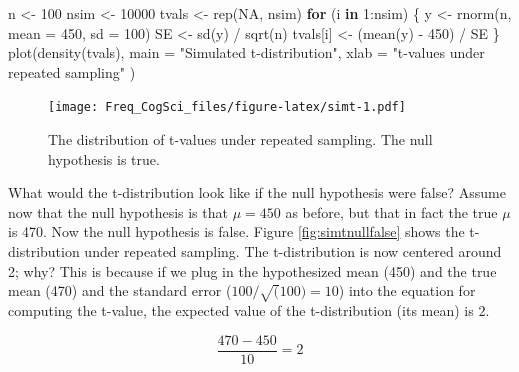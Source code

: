 \documentclass[
  12pt,
]{krantz}
\newenvironment{Shaded}{\begin{snugshade}}{\end{snugshade}}
\newcommand{\AttributeTok}[1]{\textcolor[rgb]{0.77,0.63,0.00}{#1}}
\newcommand{\ConstantTok}[1]{\textcolor[rgb]{0.00,0.00,0.00}{#1}}
\newcommand{\ControlFlowTok}[1]{\textcolor[rgb]{0.13,0.29,0.53}{\textbf{#1}}}
\newcommand{\DecValTok}[1]{\textcolor[rgb]{0.00,0.00,0.81}{#1}}
\newcommand{\FunctionTok}[1]{\textcolor[rgb]{0.00,0.00,0.00}{#1}}
\newcommand{\NormalTok}[1]{#1}
\newcommand{\OtherTok}[1]{\textcolor[rgb]{0.56,0.35,0.01}{#1}}
\newcommand{\SpecialCharTok}[1]{\textcolor[rgb]{0.00,0.00,0.00}{#1}}
\newcommand{\StringTok}[1]{\textcolor[rgb]{0.31,0.60,0.02}{#1}}
\theoremstyle{definition}
\theoremstyle{definition}
\theoremstyle{definition}
\theoremstyle{definition}
\theoremstyle{remark}
\begin{document}
\begin{Shaded}
\begin{Highlighting}[]
\NormalTok{n }\OtherTok{\textless{}{-}} \DecValTok{100}
\NormalTok{nsim }\OtherTok{\textless{}{-}} \DecValTok{10000}
\NormalTok{tvals }\OtherTok{\textless{}{-}} \FunctionTok{rep}\NormalTok{(}\ConstantTok{NA}\NormalTok{, nsim)}
\ControlFlowTok{for}\NormalTok{ (i }\ControlFlowTok{in} \DecValTok{1}\SpecialCharTok{:}\NormalTok{nsim) \{}
\NormalTok{  y }\OtherTok{\textless{}{-}} \FunctionTok{rnorm}\NormalTok{(n, }\AttributeTok{mean =} \DecValTok{450}\NormalTok{, }\AttributeTok{sd =} \DecValTok{100}\NormalTok{)}
\NormalTok{  SE }\OtherTok{\textless{}{-}} \FunctionTok{sd}\NormalTok{(y) }\SpecialCharTok{/} \FunctionTok{sqrt}\NormalTok{(n)}
\NormalTok{  tvals[i] }\OtherTok{\textless{}{-}}\NormalTok{ (}\FunctionTok{mean}\NormalTok{(y) }\SpecialCharTok{{-}} \DecValTok{450}\NormalTok{) }\SpecialCharTok{/}\NormalTok{ SE}
\NormalTok{\}}
\FunctionTok{plot}\NormalTok{(}\FunctionTok{density}\NormalTok{(tvals),}
  \AttributeTok{main =} \StringTok{"Simulated t{-}distribution"}\NormalTok{,}
  \AttributeTok{xlab =} \StringTok{"t{-}values under repeated sampling"}
\NormalTok{)}
\end{Highlighting}
\end{Shaded}

\begin{figure}
\centering
\texttt{[image: Freq\_CogSci\_files/figure-latex/simt-1.pdf]}
\caption{\label{fig:simt}The distribution of t-values under repeated sampling. The null hypothesis is true.}
\end{figure}

What would the t-distribution look like if the null hypothesis were false? Assume now that the null hypothesis is that \(\mu=450\) as before, but that in fact the true \(\mu\) is 470. Now the null hypothesis is false. Figure \ref{fig:simtnullfalse} shows the t-distribution under repeated sampling. The t-distribution is now centered around 2; why? This is because if we plug in the hypothesized mean (450) and the true mean (470) and the standard error (\(100/\sqrt(100)=10\)) into the equation for computing the t-value, the expected value of the t-distribution (its mean) is \(2\).

\begin{equation}
\frac{470-450}{10} = 2
\end{equation}
\end{document}
